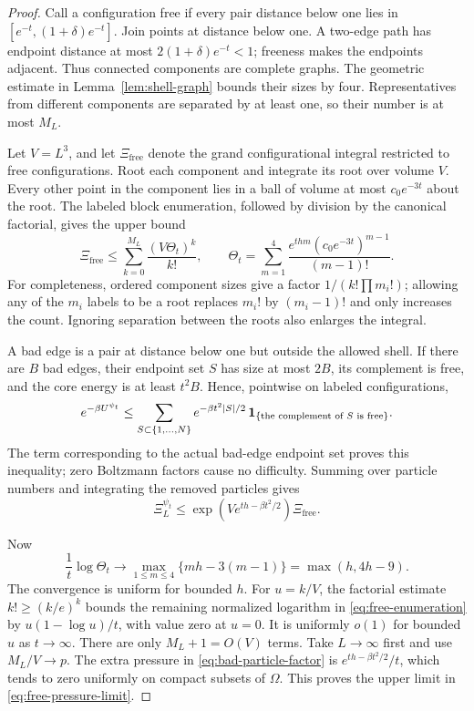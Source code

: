 \begin{proof}
Call a configuration free if every pair distance below one lies in
\([e^{-t},(1+\delta)e^{-t}]\).  Join points at distance below one.
A two-edge path has endpoint distance at most
\(2(1+\delta)e^{-t}<1\); freeness makes the endpoints adjacent.
Thus connected components are complete graphs.
The geometric estimate in Lemma~\ref{lem:shell-graph} bounds
their sizes by four.  Representatives from different components
are separated by at least one, so their number is at most \(M_L\).

Let \(V=L^3\), and let \(\Xi_{\mathrm{free}}\) denote the grand
configurational integral restricted to free configurations.  Root
each component and integrate its root over volume \(V\).
Every other point in the component lies in a ball of volume at most
\(c_0e^{-3t}\) about the root.  The labeled block enumeration,
followed by division by the canonical factorial, gives the upper bound
\begin{equation}\label{eq:free-enumeration}
 \Xi_{\mathrm{free}}\le
 \sum_{k=0}^{M_L}\frac{(V\Theta_t)^k}{k!},
 \qquad
 \Theta_t=\sum_{m=1}^4
 \frac{e^{thm}(c_0e^{-3t})^{m-1}}{(m-1)!}.
\end{equation}
For completeness, ordered component sizes give a factor
\(1/(k!\prod m_i!)\); allowing any of the \(m_i\) labels to be a
root replaces \(m_i!\) by \((m_i-1)!\) and only increases the count.
Ignoring separation between the roots also enlarges the integral.

A bad edge is a pair at distance below one but outside the allowed
shell.  If there are \(B\) bad edges, their endpoint set \(S\) has
size at most \(2B\), its complement is free, and the core energy
is at least \(t^2B\).  Hence, pointwise on labeled configurations,
\[
 e^{-\beta U^{\psi_t}}
 \le \sum_{S\subset\{1,\ldots,N\}}
        e^{-\beta t^2|S|/2}\,
        {\bf1}_{\{\text{the complement of }S\text{ is free}\}}.
\]
The term corresponding to the actual bad-edge endpoint set proves
this inequality; zero Boltzmann factors cause no difficulty.
Summing over particle numbers and integrating the removed particles
gives
\begin{equation}\label{eq:bad-particle-factor}
 \Xi_L^{\psi_t}
 \le \exp\!\left(Ve^{th-\beta t^2/2}\right)\Xi_{\mathrm{free}}.
\end{equation}

Now
\[
 \frac1t\log\Theta_t
 \longrightarrow
 \max_{1\le m\le4}\{mh-3(m-1)\}
 =\max(h,4h-9).
\]
The convergence is uniform for bounded \(h\).  For \(u=k/V\),
the factorial estimate \(k!\ge(k/e)^k\) bounds the remaining
normalized logarithm in \eqref{eq:free-enumeration} by
\(u(1-\log u)/t\), with value zero at \(u=0\).
It is uniformly \(o(1)\) for bounded \(u\) as \(t\to\infty\).
There are only \(M_L+1=O(V)\) terms.
Take \(L\to\infty\) first and use \(M_L/V\to p\).
The extra pressure in \eqref{eq:bad-particle-factor} is
\(e^{th-\beta t^2/2}/t\), which tends to zero uniformly on compact
subsets of \(\Omega\).  This proves the upper limit in
\eqref{eq:free-pressure-limit}.


\end{proof}
